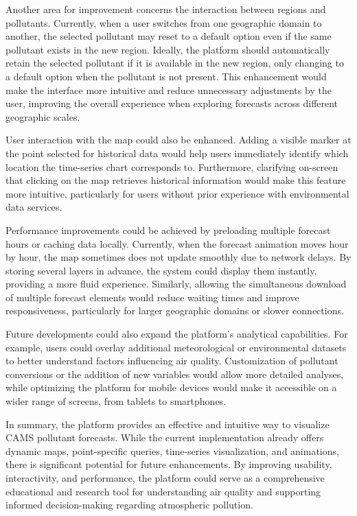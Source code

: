 Another area for improvement concerns the interaction between regions and pollutants. Currently, when a user switches from one geographic domain to another, the selected pollutant may reset to a default option even if the same pollutant exists in the new region. Ideally, the platform should automatically retain the selected pollutant if it is available in the new region, only changing to a default option when the pollutant is not present. This enhancement would make the interface more intuitive and reduce unnecessary adjustments by the user, improving the overall experience when exploring forecasts across different geographic scales.

User interaction with the map could also be enhanced. Adding a visible marker at the point selected for historical data would help users immediately identify which location the time-series chart corresponds to. Furthermore, clarifying on-screen that clicking on the map retrieves historical information would make this feature more intuitive, particularly for users without prior experience with environmental data services.

Performance improvements could be achieved by preloading multiple forecast hours or caching data locally. Currently, when the forecast animation moves hour by hour, the map sometimes does not update smoothly due to network delays. By storing several layers in advance, the system could display them instantly, providing a more fluid experience. Similarly, allowing the simultaneous download of multiple forecast elements would reduce waiting times and improve responsiveness, particularly for larger geographic domains or slower connections.

Future developments could also expand the platform’s analytical capabilities. For example, users could overlay additional meteorological or environmental datasets to better understand factors influencing air quality. Customization of pollutant conversions or the addition of new variables would allow more detailed analyses, while optimizing the platform for mobile devices would make it accessible on a wider range of screens, from tablets to smartphones.

In summary, the platform provides an effective and intuitive way to visualize CAMS pollutant forecasts. While the current implementation already offers dynamic maps, point-specific queries, time-series visualization, and animations, there is significant potential for future enhancements. By improving usability, interactivity, and performance, the platform could serve as a comprehensive educational and research tool for understanding air quality and supporting informed decision-making regarding atmospheric pollution.


